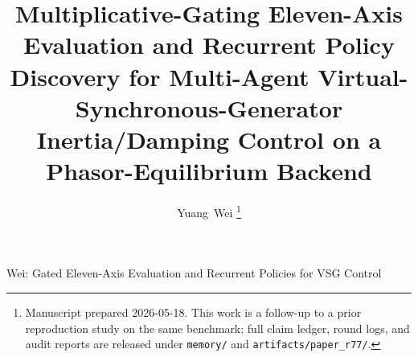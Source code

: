 \documentclass[journal,onecolumn,11pt]{IEEEtran}
\begin{document}
\title{Multiplicative-Gating Eleven-Axis Evaluation and Recurrent
Policy Discovery for Multi-Agent Virtual-Synchronous-Generator
Inertia/Damping Control on a Phasor-Equilibrium Backend}

\author{Yuang~Wei%
\thanks{Manuscript prepared 2026-05-18. This work is a follow-up to a
prior reproduction study \cite{wei2026reproduction} on the same
benchmark; full claim ledger, round logs, and audit reports are
released under \texttt{memory/} and \texttt{artifacts/paper\_r77/}.}}

%
{Wei: Gated Eleven-Axis Evaluation and Recurrent Policies for VSG Control}

\maketitle
\end{document}
